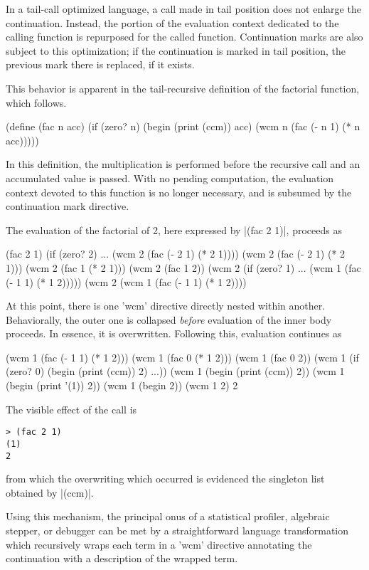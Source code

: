 \documentclass{llncs}
\begin{document}
In a tail-call optimized language, a call made in tail position does not enlarge the continuation. Instead, the portion of the evaluation context dedicated to the calling function is repurposed for the called function. Continuation marks are also subject to this optimization; if the continuation is marked in tail position, the previous mark there is replaced, if it exists.

This behavior is apparent in the tail-recursive definition of the factorial function, which follows.
\begin{schemedisplay}
(define (fac n acc)
  (if (zero? n)
      (begin
        (print (ccm))
        acc)
      (wcm n (fac (- n 1) (* n acc)))))
\end{schemedisplay}
In this definition, the multiplication is performed before the recursive call and an accumulated value is passed. With no pending computation, the evaluation context devoted to this function is no longer necessary, and is subsumed by the continuation mark directive.

The evaluation of the factorial of 2, here expressed by \scheme|(fac 2 1)|, proceeds as
\begin{schemedisplay}
(fac 2 1)
(if (zero? 2) ... (wcm 2 (fac (- 2 1) (* 2 1))))
(wcm 2 (fac (- 2 1) (* 2 1)))
(wcm 2 (fac 1 (* 2 1)))
(wcm 2 (fac 1 2))
(wcm 2 (if (zero? 1) ... (wcm 1 (fac (- 1 1) (* 1 2)))))
(wcm 2 (wcm 1 (fac (- 1 1) (* 1 2))))
\end{schemedisplay}
At this point, there is one \scheme'wcm' directive directly nested within another. Behaviorally, the outer one is collapsed \emph{before} evaluation of the inner body proceeds. In essence, it is overwritten. Following this, evaluation continues as
\begin{schemedisplay}
(wcm 1 (fac (- 1 1) (* 1 2)))
(wcm 1 (fac 0 (* 1 2)))
(wcm 1 (fac 0 2))
(wcm 1 (if (zero? 0) (begin (print (ccm)) 2) ...))
(wcm 1 (begin (print (ccm)) 2))
(wcm 1 (begin (print '(1)) 2))
(wcm 1 (begin 2))
(wcm 1 2)
2
\end{schemedisplay}
The visible effect of the call is
\begin{verbatim}
> (fac 2 1)
(1)
2
\end{verbatim}
from which the overwriting which occurred is evidenced the singleton list obtained by \scheme|(ccm)|.

Using this mechanism, the principal onus of a statistical profiler, algebraic stepper, or debugger can be met by a straightforward language transformation which recursively wraps each term in a \scheme'wcm' directive annotating the continuation with a description of the wrapped term.
\end{document}
